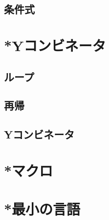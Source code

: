\documentclass[twocolumn]{jsbook}
\begin{document}
\section{条件式}

\chapter{*Yコンビネータ}

\section{ループ}

\section{再帰}

\section{Yコンビネータ}

\chapter{*マクロ}

\chapter{*最小の言語}
\end{document}

